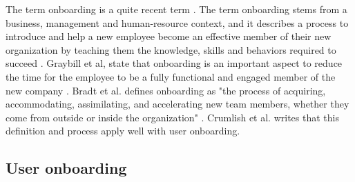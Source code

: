 The term onboarding is a quite recent term \cite{Dai2007}. The term onboarding stems from a business, management and human-resource context, and it describes a process to introduce and help a new employee become an effective member of their new organization by teaching them the knowledge, skills and behaviors required to succeed \cite{Bauer2011}. Graybill et al, state that onboarding is an important aspect to reduce the time for the employee to be a fully functional and engaged member of the new company \cite{GraybillJolieO;HudsonCarpenterMariaTaesil;OffordJeromeJr;PiorunMary;Shaffer2013}. Bradt et al. defines onboarding as "the process of acquiring, accommodating, assimilating, and accelerating new team members, whether they come from outside or inside the organization" \cite{Bradt2009}. Crumlish et al. \cite{Crumlish2009} writes that this definition and process apply well with user onboarding.

\subsection{User onboarding}
